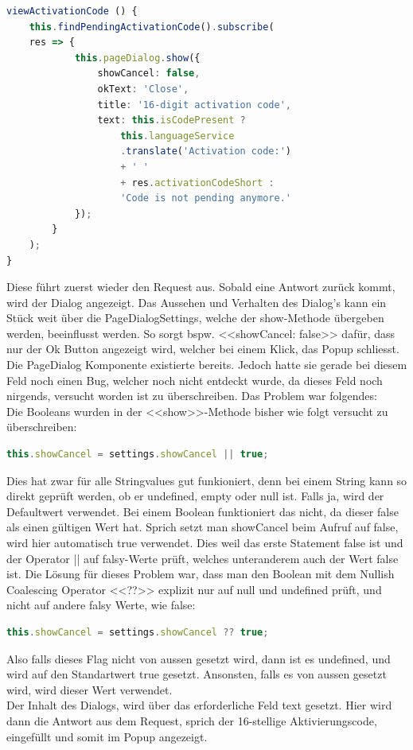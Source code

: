 \begin{lstlisting}[language=TypeScript]
viewActivationCode () {
	this.findPendingActivationCode().subscribe(
	res => {
			this.pageDialog.show({
				showCancel: false,
				okText: 'Close',
				title: '16-digit activation code',
				text: this.isCodePresent ?
					this.languageService
					.translate('Activation code:')
					+ ' '
					+ res.activationCodeShort :
					'Code is not pending anymore.'
			});
		}
	);
}
\end{lstlisting}
Diese führt zuerst wieder den Request aus. Sobald eine Antwort zurück kommt, wird der Dialog angezeigt. Das Aussehen und Verhalten des Dialog's kann ein Stück weit über die PageDialogSettings, welche der show-Methode übergeben werden, beeinflusst werden. So sorgt bspw. <<showCancel: false>> dafür, dass nur der Ok Button angezeigt wird, welcher bei einem Klick, das Popup schliesst. Die PageDialog Komponente existierte bereits. Jedoch hatte sie gerade bei diesem Feld noch einen Bug, welcher noch nicht entdeckt wurde, da dieses Feld noch nirgends, versucht worden ist zu überschreiben. Das Problem war folgendes:\\
Die Booleans wurden in der <<show>>-Methode bisher wie folgt versucht zu überschreiben:
\begin{lstlisting}[language=TypeScript]
this.showCancel = settings.showCancel || true;
\end{lstlisting}
Dies hat zwar für alle Stringvalues gut funkioniert, denn bei einem String kann so direkt geprüft werden, ob er undefined, empty oder null ist. Falls ja, wird der Defaultwert verwendet.
Bei einem Boolean funktioniert das nicht, da dieser false als einen gültigen Wert hat. Sprich setzt man showCancel beim Aufruf auf false, wird hier automatisch true verwendet. Dies weil das erste Statement false ist und der Operator || auf falsy-Werte prüft, welches unteranderem auch der Wert false ist. Die Lösung für dieses Problem war, dass man den Boolean mit dem Nullish Coalescing Operator <<??>> \cite{nullish} explizit nur auf null und undefined prüft, und nicht auf andere falsy Werte, wie false:
\begin{lstlisting}[language=TypeScript]
this.showCancel = settings.showCancel ?? true;
\end{lstlisting}
Also falls dieses Flag nicht von aussen gesetzt wird, dann ist es undefined, und wird auf den Standartwert true gesetzt. Ansonsten, falls es von aussen gesetzt wird, wird dieser Wert verwendet.
\\
Der Inhalt des Dialogs, wird über das erforderliche Feld \flqq text\frqq{} gesetzt. Hier wird dann die Antwort aus dem Request, sprich der 16-stellige Aktivierungscode, eingefüllt und somit im Popup angezeigt.
